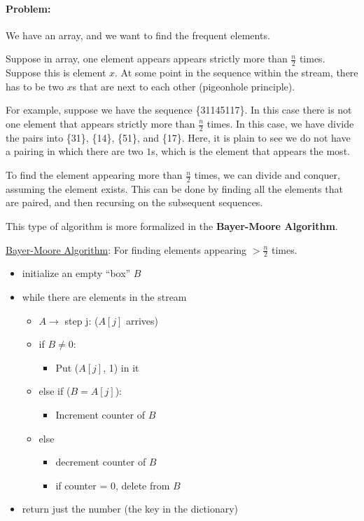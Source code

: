 \documentclass[11pt]{article}
\begin{document}
\paragraph{Problem:} We have an array, and we want to find the frequent elements.

Suppose in array, one element appears appears strictly more than $\frac{n}{2}$ times. Suppose this is element $x$. At some point in the sequence within the stream, there has to be two $x$s that are next to each other (pigeonhole principle). 

\smallskip

For example, suppose we have the sequence \{31145117\}. In this case there is not one element that appears strictly more than $\frac{n}{2}$ times. In this case, we have divide the pairs into \{31\}, \{14\}, \{51\}, and \{17\}. Here, it is plain to see we do not have a pairing in which there are two $1$s, which is the element that appears the most.

\smallskip

To find the element appearing more than $\frac{n}{2}$ times, we can divide and conquer, assuming the element exists. This can be done by finding all the elements that are paired, and then recursing on the subsequent sequences. 

\smallskip

This type of algorithm is more formalized in the \textbf{Bayer-Moore Algorithm}.

\begin{mdframed}[backgroundcolor=blue!05,topline=false,bottomline=false,leftline=false,rightline=false] 
	\underline{\sc Bayer-Moore Algorithm}:
	For finding elements appearing $> \frac{n}{2}$ times.
	\begin{itemize}
		\item initialize an empty ``box'' $B$
		\item while there are elements in the stream
		\begin{itemize}
    			\item $A \rightarrow$ step j: ($A[j]$ arrives)
    				\item if $B \neq 0$:
    				\begin{itemize}
    					\item Put ($A[j]$, 1) in it
    				\end{itemize}
    			\item else if ($B = A[j]$):
    				\begin{itemize}
    					\item Increment counter of $B$
    				\end{itemize}
    			\item else
    				\begin{itemize}
    					\item decrement counter of $B$
    					\item if counter = 0, delete from $B$
    				\end{itemize}	
		\end{itemize}
		\item return just the number (the key in the dictionary)
	\end{itemize}
\end{mdframed}
\end{document}
